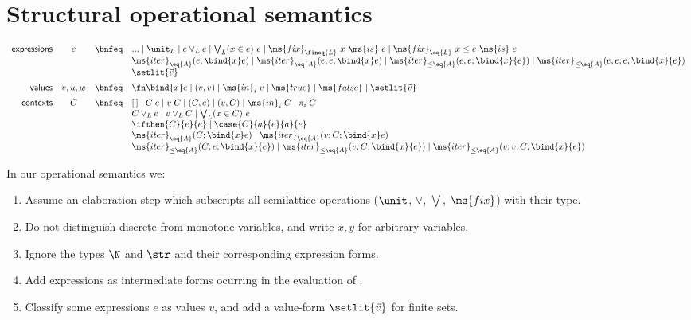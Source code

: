 \documentclass{article}
\newcommand{\tforin}[2]{\bigvee_{#1}(#2)\ }
\newcommand{\tfix}[2]{\ms{fix}_{#1}~{#2}~\ms{is}~}
\newcommand{\tfixle}[3]{\tfix{#1}{#2 \le #3}}
\newcommand{\hole}{[\,]}
\newcommand{\iter}[4]{\ms{iter}_{#1}({#2}; \bind{#3}#4)}
\newcommand{\iterstep}[5]{\ms{iter}_{#1}({#2}; {#3}; {\bind{#4}#5})}
\newcommand{\iterle}[5]{\ms{iter}_{{\le}#1}({#2}; {#3}; \bind{#4}{#5})}
\newcommand{\iterlestep}[6]{\ms{iter}_{{\le}#1}({#2}; {#3}; {#4}; \bind{#5}{#6})}
\begin{document}
\section{Structural operational semantics}

\[\begin{array}{rccl}
  \textsf{expressions} & e
  &\bnfeq& ... \pipe \unit_L \pipe e \vee_L e \pipe \tforin{L}{x \in e} e
  \pipe \tfix{\fineq{L}}{x}{e} \pipe \tfixle{\eq{L}}{x}{e}{e}\\
  &&& \iter{\eq{A}}{e}{x}{e} \pipe \iterstep{\eq{A}}{e}{e}{x}{e}
  \pipe \iterle{\eq{A}}{e}{e}{x}{e} \pipe \iterlestep{\eq{A}}{e}{e}{e}{x}{e}\\
  &&& \setlit{\vec{v}}
  \vspace{0.5em}\\
  \textsf{values} & v,u,w
  &\bnfeq& \fn\bind{x} e \pipe (v, v) \pipe \ms{in}_i\; v
  \pipe \ms{true} \pipe \ms{false} \pipe \setlit{\vec{v}}
  \vspace{0.5em}\\
  \textsf{contexts} & C
  &\bnfeq& \hole \pipe C\;e \pipe v\;C \pipe (C, e) \pipe (v, C) \pipe \ms{in}_i\;C
  \pipe \pi_i \; C\\
  &&& C \vee_L e \pipe v \vee_L C \pipe \tforin{L}{x \in C} e\\
  &&& \ifthen{C}{e}{e} \pipe \case{C}{a}{e}{a}{e}\\
  &&& \iter{\eq{A}}{C}{x}{e} \pipe \iterstep{\eq{A}}{v}{C}{x}{e}\\
  &&& \iterle{\eq{A}}{C}{e}{x}{e} \pipe \iterle{\eq{A}}{v}{C}{x}{e}
  \pipe \iterlestep{\eq{A}}{v}{v}{C}{x}{e}
\end{array}\]

\noindent In our operational semantics we:
\begin{enumerate}
\item Assume an elaboration step which subscripts all semilattice operations
($\unit$, $\vee$, $\bigvee$, $\ms{fix}$) with their type.
\item Do not distinguish discrete from monotone variables, and write $x,y$ for
  arbitrary variables.
\item Ignore the types $\N$ and $\str$ and their corresponding expression forms.
\item Add 
expressions as intermediate forms ocurring in the evaluation of .
\item Classify some expressions $e$ as values $v$, and add a value-form
  $\setlit{\vec{v}}$ for finite sets.
\end{enumerate}
\end{document}
